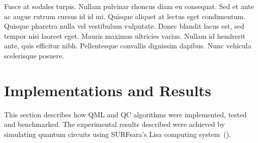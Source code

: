 \documentclass[a4paper,10pt]{article}
\begin{document}
Fusce at sodales turpis. Nullam pulvinar rhoncus diam eu consequat. Sed et ante ac augue rutrum cursus id id mi. Quisque aliquet at lectus eget condimentum. Quisque pharetra nulla vel vestibulum vulputate. Donec blandit lacus est, sed tempor nisi laoreet eget. Mauris maximus ultricies varius. Nullam id hendrerit ante, quis efficitur nibh. Pellentesque convallis dignissim dapibus. Nunc vehicula scelerisque posuere.

\section{Implementations and Results} \label{sec:implementation-and-results}
This section describes how QML and QC algorithms were implemented, tested and benchmarked.
The experimental results described were achieved by simulating quantum circuits using SURFsara's Lisa computing system~(\cite{surfsara-lisa}).
\end{document}
